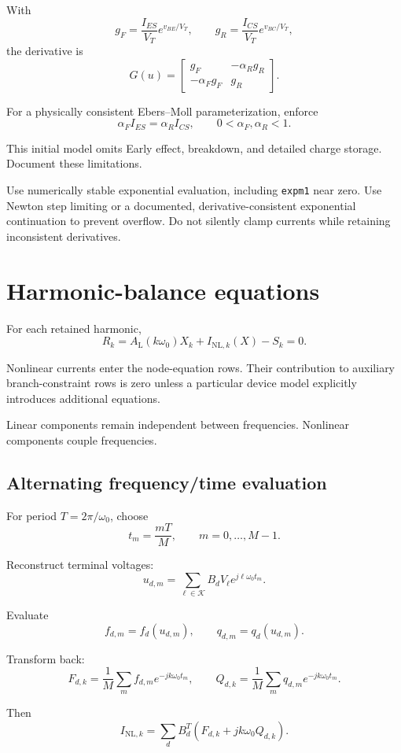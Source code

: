 \documentclass[11pt,a4paper]{article}
\begin{document}
With
\[
 g_F=\frac{I_{ES}}{V_T}e^{v_{BE}/V_T},\qquad
 g_R=\frac{I_{CS}}{V_T}e^{v_{BC}/V_T},
\]
the derivative is
\[
 G(u)=
 \begin{bmatrix}
 g_F&-\alpha_R g_R\\
 -\alpha_F g_F&g_R
 \end{bmatrix}.
\]

For a physically consistent Ebers--Moll parameterization, enforce
\[
 \alpha_F I_{ES}=\alpha_R I_{CS},
 \qquad 0<\alpha_F,\alpha_R<1.
\]

This initial model omits Early effect, breakdown, and detailed charge
storage. Document these limitations.

Use numerically stable exponential evaluation, including
\texttt{expm1} near zero. Use Newton step limiting or a documented,
derivative-consistent exponential continuation to prevent overflow.
Do not silently clamp currents while retaining inconsistent derivatives.

\section{Harmonic-balance equations}

For each retained harmonic,
\[
 R_k=
 A_{\mathrm L}(k\omega_0)X_k+
 I_{\mathrm{NL},k}(X)-S_k=0.
\]

Nonlinear currents enter the node-equation rows. Their contribution
to auxiliary branch-constraint rows is zero unless a particular device
model explicitly introduces additional equations.

Linear components remain independent between frequencies.
Nonlinear components couple frequencies.

\subsection{Alternating frequency/time evaluation}

For period $T=2\pi/\omega_0$, choose
\[
 t_m=\frac{mT}{M},\qquad m=0,\ldots,M-1.
\]

Reconstruct terminal voltages:
\[
 u_{d,m}=
 \sum_{\ell\in\mathcal K}B_d V_\ell
 e^{j\ell\omega_0t_m}.
\]

Evaluate
\[
 f_{d,m}=f_d(u_{d,m}),\qquad
 q_{d,m}=q_d(u_{d,m}).
\]

Transform back:
\[
 F_{d,k}=\frac1M\sum_m f_{d,m}e^{-jk\omega_0t_m},
 \qquad
 Q_{d,k}=\frac1M\sum_m q_{d,m}e^{-jk\omega_0t_m}.
\]

Then
\[
 \boxed{
 I_{\mathrm{NL},k}
 =\sum_d B_d^T
 \left(F_{d,k}+jk\omega_0Q_{d,k}\right).
 }
\]
\end{document}
